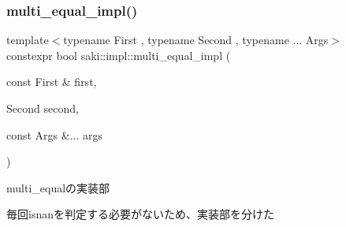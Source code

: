 \subsubsection{\texorpdfstring{multi\+\_\+equal\+\_\+impl()}{multi\_equal\_impl()}\hspace{0.1cm}{\footnotesize\ttfamily [2/2]}}
{\footnotesize\ttfamily template$<$typename First , typename Second , typename ... Args$>$ \\
constexpr bool saki\+::impl\+::multi\+\_\+equal\+\_\+impl (\begin{DoxyParamCaption}\item[{const First \&}]{first,  }\item[{Second}]{second,  }\item[{const Args \&...}]{args }\end{DoxyParamCaption})}



multi\+\_\+equalの実装部 

毎回isnanを判定する必要がないため、実装部を分けた 